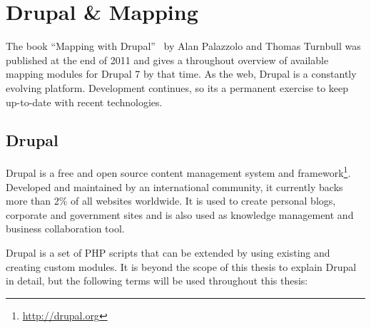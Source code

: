 
%
%

\section{Drupal \& Mapping}
\label{chapter:drupal-mapping}

The book ``Mapping with Drupal''~\cite{Zzolo11mappingdrupal} by Alan Palazzolo and Thomas Turnbull was published at the end of 2011 and gives a throughout overview of available mapping modules for Drupal 7 by that time. As the web, Drupal is a constantly evolving platform. Development continues, so its a permanent exercise to keep up-to-date with recent technologies.

\subsection{Drupal}

Drupal is a free and open source content management system and framework\footnote{\url{http://drupal.org}}. Developed and maintained by an international community, it currently backs more than 2\% of all websites worldwide. It is used to create personal blogs, corporate and government sites and is also used as knowledge management and business collaboration tool\cite{wiki:drupal}.

Drupal is a set of PHP scripts that can be extended by using existing and creating custom modules. It is beyond the scope of this thesis to explain Drupal in detail, but the following terms will be used throughout this thesis:

